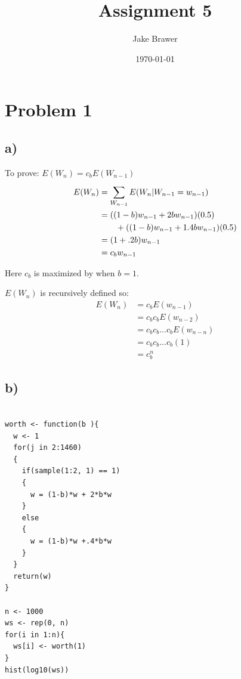 \documentclass[11pt]{article}
\author{Jake Brawer}
\date{\today}
\title{Assignment 5}
\begin{document}
\maketitle


\section*{Problem 1}
\label{sec:orgc48955e}

\subsection*{a)}
\label{sec:org2f9eaa8}

To prove: \(E(W_{n}) = c_{b}E(W_{n - 1})\)
\begin{align}
  E(W_{n}) &= \sum_{W_{n - 1}}^{} E(W_{n} |W_{n - 1} = w_{n - 1})\\
  &= ((1 - b)w_{n-1} + 2bw_{n-1})(0.5)\\
  & \qquad+ ((1 - b)w_{n-1} + 1.4bw_{n-1})(0.5) \notag \\
  &= (1 + .2b)w_{n - 1}\\
  &= c_{b}w_{n -1}
\end{align}

Here \(c_{b}\) is maximized by when \(b = 1\).

\(E(W_{n})\) is recursively defined so:
\begin{align}
  E(W_n) &= c_{b}E(w_{n-1})\\
         &= c_{b}c_{b}E(w_{n-2})\\
         &= c_{b}c_{b}...c_{b}E(w_{n-n})\\
         &= c_{b}c_{b}...c_{b}(1) \tag{Given}\\\
         &= c_{b}^{n}
\end{align}

\subsection*{b)}
\label{sec:orgfe7b91c}

\begin{verbatim}

worth <- function(b ){
  w <- 1
  for(j in 2:1460)
  {
    if(sample(1:2, 1) == 1)
    {
      w = (1-b)*w + 2*b*w
    }
    else
    {
      w = (1-b)*w +.4*b*w
    }
  }
  return(w)
}

n <- 1000
ws <- rep(0, n)
for(i in 1:n){
  ws[i] <- worth(1)
}
hist(log10(ws))

\end{verbatim}
\end{document}
